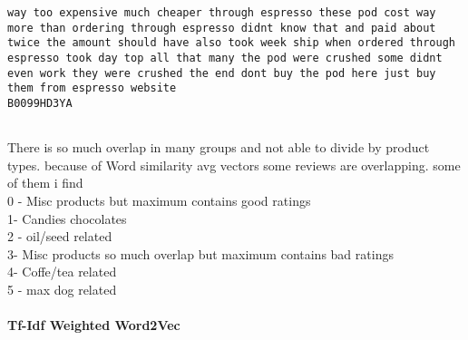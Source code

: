 \documentclass[11pt]{article}
\begin{document}
\begin{Verbatim}[commandchars=\\\{\}]
way too expensive much cheaper through espresso these pod cost way more than ordering through espresso didnt know that and paid about twice the amount should have also took week ship when ordered through espresso took day top all that many the pod were crushed some didnt even work they were crushed the end dont buy the pod here just buy them from espresso website
B0099HD3YA


    \end{Verbatim}

    There is so much overlap in many groups and not able to divide by
product types. because of Word similarity avg vectors some reviews are
overlapping. some of them i find\\
0 - Misc products but maximum contains good ratings\\
1- Candies chocolates\\
2 - oil/seed related\\
3- Misc products so much overlap but maximum contains bad ratings\\
4- Coffe/tea related\\
5 - max dog related

    \paragraph{Tf-Idf Weighted Word2Vec}\label{tf-idf-weighted-word2vec}
\end{document}
